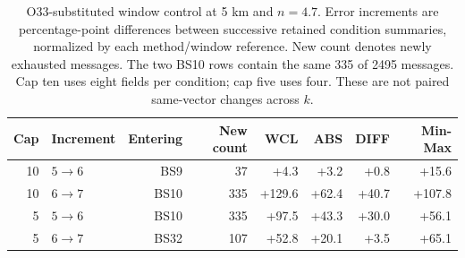 \begin{table}[htbp]\centering\small
\caption{O33-substituted window control at 5 km and $n=4.7$. Error increments are percentage-point differences between successive retained condition summaries, normalized by each method/window reference. New count denotes newly exhausted messages. The two BS10 rows contain the same 335 of 2495 messages. Cap ten uses eight fields per condition; cap five uses four. These are not paired same-vector changes across $k$.}\label{tab:o33window}
\begin{tabular}{rlrrrrrr}
\toprule Cap & Increment & Entering & New count & WCL & ABS & DIFF & Min-Max\\\midrule
10 & $5\to6$ & BS9 & 37 & +4.3 & +3.2 & +0.8 & +15.6\\
10 & $6\to7$ & BS10 & 335 & +129.6 & +62.4 & +40.7 & +107.8\\
5 & $5\to6$ & BS10 & 335 & +97.5 & +43.3 & +30.0 & +56.1\\
5 & $6\to7$ & BS32 & 107 & +52.8 & +20.1 & +3.5 & +65.1\\
\bottomrule
\end{tabular}\end{table}
